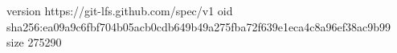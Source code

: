 version https://git-lfs.github.com/spec/v1
oid sha256:ea09a9c6fbf704b05acb0cdb649b49a275fba72f639e1eca4c8a96ef38ac9b99
size 275290
